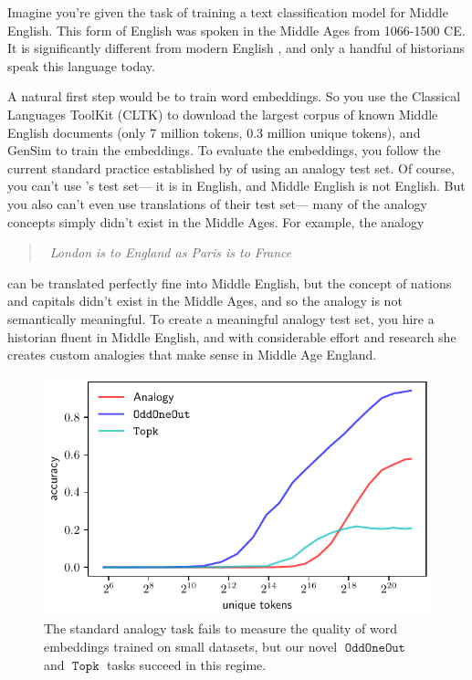 \documentclass[11pt,a4paper]{article}
\DeclareMathOperator{\OddOneOut}{\texttt{OddOneOut}}
\DeclareMathOperator{\topk}{\texttt{Topk}}
\begin{document}
Imagine you're given the task of training a text classification model for Middle English.
This form of English was spoken in the Middle Ages from 1066-1500 CE.
It is significantly different from modern English \citep{chamonikolasova2014middle},
and only a handful of historians speak this language today.

A natural first step would be to train word embeddings.
So you use the Classical Languages ToolKit (CLTK) \citep{johnson2014} to download the largest corpus of known Middle English documents (only 7 million tokens, 0.3 million unique tokens),
and GenSim \citep{rehurek_lrec} to train the embeddings.
To evaluate the embeddings, you follow the current standard practice established by \citet{mikolov2013efficient} of using an analogy test set.
Of course, you can't use \citet{mikolov2013efficient}'s test set---%
it is in English,
and Middle English is not English.
But you also can't even use translations of their test set---%
many of the analogy concepts simply didn't exist in the Middle Ages.
For example, the analogy
\begin{quote}
    ~\!\!\!\!\!\!\emph{London is to England as Paris is to France}
\end{quote}
can be translated perfectly fine into Middle English,
but the concept of nations and capitals didn't exist in the Middle Ages,
and so the analogy is not semantically meaningful.
To create a meaningful analogy test set, you hire a historian fluent in Middle English,
and with considerable effort and research she creates custom analogies that make sense in Middle Age England.

\begin{figure}
\centering
\includegraphics[width=1\columnwidth]{size_vs_acc.pdf} 
\caption{
    The standard analogy task \citep{mikolov2013efficient} fails to measure the quality of word embeddings trained on small datasets,
but our novel $\OddOneOut$ and $\topk$ tasks succeed in this regime.
}
\label{fig:size_vs_acc}
\end{figure}
\end{document}
